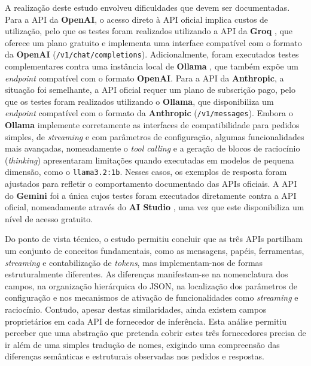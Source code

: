   A realização deste estudo envolveu dificuldades que devem ser documentadas. Para a API da \textbf{OpenAI}, o acesso direto à API oficial implica custos de utilização, pelo que os testes foram realizados utilizando a API da \textbf{Groq} \cite{groq_api}, que oferece um plano gratuito e implementa uma interface compatível com o formato da \textbf{OpenAI} (\texttt{/v1/chat/completions}). Adicionalmente, foram executados testes complementares contra uma instância local de \textbf{Ollama} \cite{ollama_docs}, que também expõe um \textit{endpoint} compatível com o formato \textbf{OpenAI}. Para a API da \textbf{Anthropic}, a situação foi semelhante, a API oficial requer um plano de subscrição pago, pelo que os testes foram realizados utilizando o \textbf{Ollama}, que disponibiliza um \textit{endpoint} compatível com o formato da \textbf{Anthropic} (\texttt{/v1/messages}). Embora o \textbf{Ollama} implemente corretamente as interfaces de compatibilidade para pedidos simples, de \textit{streaming} e com parâmetros de configuração, algumas funcionalidades mais avançadas, nomeadamente o \textit{tool calling} e a geração de blocos de raciocínio (\textit{thinking}) apresentaram limitações quando executadas em modelos de pequena dimensão, como o \texttt{llama3.2:1b}. Nesses casos, os exemplos de resposta foram ajustados para refletir o comportamento documentado das APIs oficiais. A API do \textbf{Gemini} foi a única cujos testes foram executados diretamente contra a API oficial, nomeadamente através do \textbf{AI Studio} \cite{google_aistudio}, uma vez que este disponibiliza um nível de acesso gratuito.

  Do ponto de vista técnico, o estudo permitiu concluir que as três APIs partilham um conjunto de conceitos fundamentais, como as mensagens, papéis, ferramentas, \textit{streaming} e contabilização de \textit{tokens}, mas implementam-nos de formas estruturalmente diferentes. As diferenças manifestam-se na nomenclatura dos campos, na organização hierárquica do JSON, na localização dos parâmetros de configuração e nos mecanismos de ativação de funcionalidades como \textit{streaming} e raciocínio. Contudo, apesar destas similaridades, ainda existem campos proprietários em cada API de fornecedor de inferência. Esta análise permitiu perceber que uma abstração que pretenda cobrir estes três fornecedores precisa de ir além de uma simples tradução de nomes, exigindo uma compreensão das diferenças semânticas e estruturais observadas nos pedidos e respostas.
  
